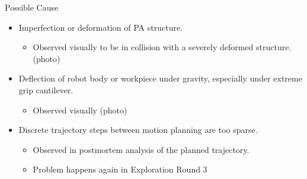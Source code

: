 Possible Cause
\begin{itemize}
    \item Imperfection or deformation of PA structure.
    \begin{itemize}
        \item Observed visually to be in collision with a severely deformed structure. (photo)
    \end{itemize}
    \item Deflection of robot body or workpiece under gravity, especially under extreme grip cantilever. 
    \begin{itemize}
        \item Observed visually (photo)
    \end{itemize}
    \item Discrete trajectory steps between motion planning are too sparse.
    \begin{itemize}
        \item Observed in postmortem analysis of the planned trajectory.
        \item Problem happens again in Exploration Round 3
    \end{itemize}
\end{itemize}


